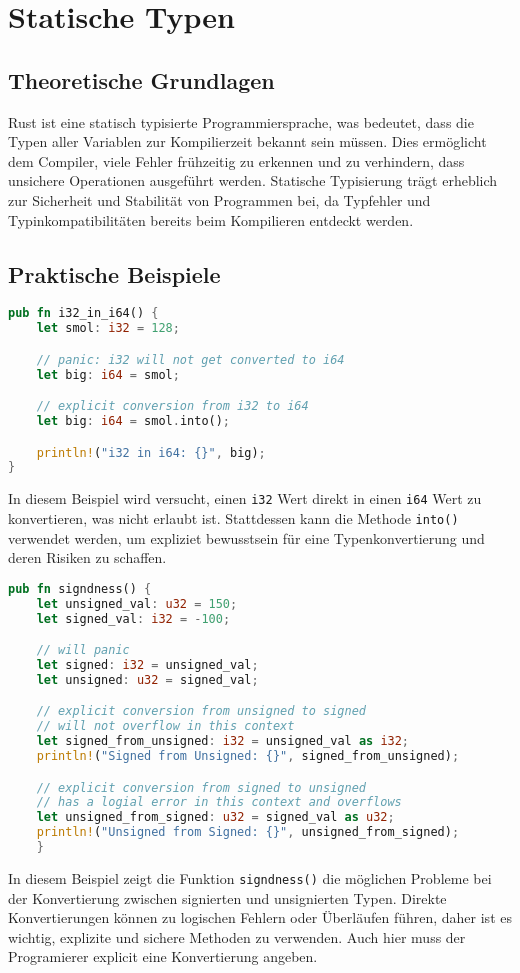 
\chapter{Statische Typen}

\section{Theoretische Grundlagen}

Rust ist eine statisch typisierte Programmiersprache, was bedeutet, dass die Typen aller Variablen zur Kompilierzeit bekannt sein müssen. 
Dies ermöglicht dem Compiler, viele Fehler frühzeitig zu erkennen und zu verhindern, dass unsichere Operationen ausgeführt werden. 
Statische Typisierung trägt erheblich zur Sicherheit und Stabilität von Programmen bei, da Typfehler und Typinkompatibilitäten bereits beim Kompilieren entdeckt werden.

\section{Praktische Beispiele}

\begin{lstlisting}[language=Rust, caption={i32 in i64}]
pub fn i32_in_i64() {
    let smol: i32 = 128;

    // panic: i32 will not get converted to i64
    let big: i64 = smol;

    // explicit conversion from i32 to i64 
    let big: i64 = smol.into();

    println!("i32 in i64: {}", big);
}
\end{lstlisting}

\noindent
In diesem Beispiel wird versucht, einen \texttt{i32} Wert direkt in einen \texttt{i64} Wert zu konvertieren, was nicht erlaubt ist. 
Stattdessen kann die Methode \texttt{into()} verwendet werden, um expliziet bewusstsein für eine Typenkonvertierung und deren Risiken zu schaffen.


\begin{lstlisting}[language=Rust, caption={Signiertheit}]
pub fn signdness() {
    let unsigned_val: u32 = 150;
    let signed_val: i32 = -100;

    // will panic 
    let signed: i32 = unsigned_val;
    let unsigned: u32 = signed_val;

    // explicit conversion from unsigned to signed
    // will not overflow in this context
    let signed_from_unsigned: i32 = unsigned_val as i32;
    println!("Signed from Unsigned: {}", signed_from_unsigned);

    // explicit conversion from signed to unsigned
    // has a logial error in this context and overflows
    let unsigned_from_signed: u32 = signed_val as u32;
    println!("Unsigned from Signed: {}", unsigned_from_signed); 
    }
\end{lstlisting}
\noindent
In diesem Beispiel zeigt die Funktion \texttt{signdness()} die möglichen Probleme bei der Konvertierung zwischen signierten und unsignierten Typen. 
Direkte Konvertierungen können zu logischen Fehlern oder Überläufen führen, daher ist es wichtig, explizite und sichere Methoden zu verwenden.
Auch hier muss der Programierer explicit eine Konvertierung angeben.

